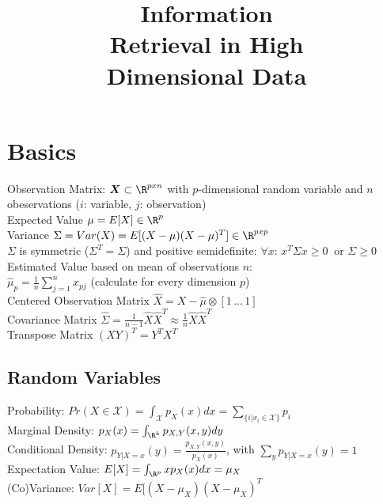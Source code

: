\documentclass[english]{latex4ei/latex4ei_sheet}
\title{Information \\Retrieval in High\\ Dimensional Data}
\begin{document}
\maketitle	%

\section{Basics}
\begin{sectionbox}
Observation Matrix: $\boldsymbol{X} \subset \R^{pxn}$ with $p$-dimensional random variable and $n$ obeservations ($i$: variable, $j$: observation)\\
Expected Value $\mu=E[X]\in\R^p$ \\
Variance $\Sigma=Var(X)=E[(X-\mu)(X-\mu)^T]\in\R^{pxp}$\\
$\Sigma$ is symmetric ($\Sigma^T = \Sigma$) and positive semidefinite: $\forall x$: $x^T\Sigma x \ge 0\ $ or $\Sigma \ge 0$\\
Estimated Value based on mean of observations $n$: \\ $\hat{\mu}_p=\frac{1}{n}\sum_{j=1}^nx_{pj}$ (calculate for every dimension $p$)\\
Centered Observation Matrix $\hat{X}=X-\hat{\mu}\otimes [1\,...\,1]$ \\
Covariance Matrix $\hat{\Sigma}=\frac{1}{n-1}\hat{X}\hat{X}^T\approx \frac{1}{n}\hat{X}\hat{X}^T$ \\
Transpose Matrix $(XY)^T=Y^TX^T$\\
\subsection{Random Variables}
Probability: $Pr(X\in\mathcal{X})=\int_\mathcal{X}p_X(x)dx=\sum_{\{i|x_i\in\mathcal{X}\}}p_i$\\
Marginal Density: $p_X(x)=\int_{\R^k}p_{X,Y}(x,y)dy$\\
Conditional Density: $p_{Y|X=x}(y)=\frac{p_{X,Y}(x,y)}{p_X(x)}$, with $\sum_{y}p_{Y|X=x}(y)=1$ \\
Expectation Value: $E[X]=\int_{\R^p}xp_X(x)dx=\mu_X$\\
(Co)Variance: $Var[X]=E[(X-\mu_X)(X-\mu_X)^T$
\end{sectionbox}
\end{document}
